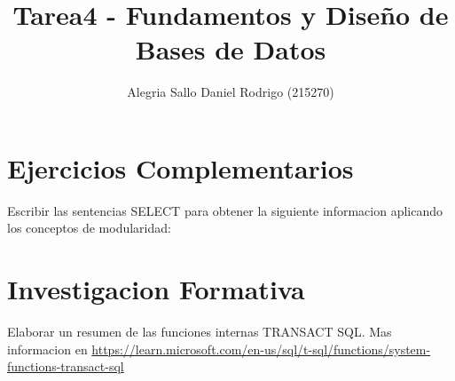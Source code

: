 \documentclass[a4paper,openany,11pt]{article}
\title{Tarea4 - Fundamentos y Diseño de Bases de Datos}
\author{Alegria Sallo Daniel Rodrigo (215270)}
\begin{document}
\maketitle

\section[5]{Ejercicios Complementarios}
Escribir las sentencias SELECT para obtener la siguiente informacion aplicando
los conceptos de modularidad:




\newpage
\section[6]{Investigacion Formativa}
Elaborar un resumen de las funciones internas TRANSACT SQL.
Mas informacion en \url{https://learn.microsoft.com/en-us/sql/t-sql/functions/system-functions-transact-sql}
\end{document}
